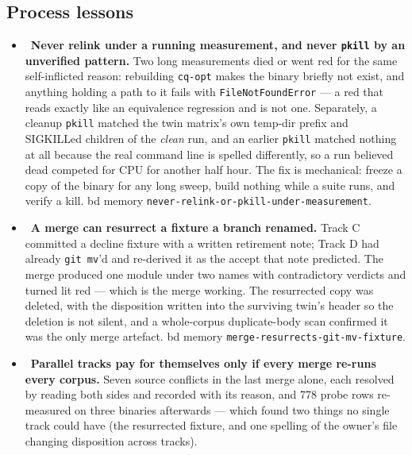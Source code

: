 \subsection*{Process lessons}
\begin{itemize}
  \item \fdoc\ \textbf{Never relink under a running measurement, and never \texttt{pkill} by an unverified
    pattern.} Two long measurements died or went red for the same self-inflicted reason: rebuilding
    \texttt{cq-opt} makes the binary briefly not exist, and anything holding a path to it fails with
    \texttt{FileNotFoundError} --- a red that reads exactly like an equivalence regression and is not one.
    Separately, a cleanup \texttt{pkill} matched the twin matrix's own temp-dir prefix and SIGKILLed
    children of the \emph{clean} run, and an earlier \texttt{pkill} matched nothing at all because the
    real command line is spelled differently, so a run believed dead competed for CPU for another half
    hour. The fix is mechanical: freeze a copy of the binary for any long sweep, build nothing while a
    suite runs, and verify a kill. bd memory \texttt{never-relink-or-pkill-under-measurement}.
  \item \fdoc\ \textbf{A merge can resurrect a fixture a branch renamed.} Track C committed a decline
    fixture with a written retirement note; Track D had already \texttt{git mv}'d and re-derived it as the
    accept that note predicted. The merge produced one module under two names with contradictory verdicts
    and turned lit red --- which is the merge working. The resurrected copy was deleted, with the
    disposition written into the surviving twin's header so the deletion is not silent, and a whole-corpus
    duplicate-body scan confirmed it was the only merge artefact. bd memory
    \texttt{merge-resurrects-git-mv-fixture}.
  \item \fdoc\ \textbf{Parallel tracks pay for themselves only if every merge re-runs every corpus.} Seven
    source conflicts in the last merge alone, each resolved by reading both sides and recorded with its
    reason, and 778 probe rows re-measured on three binaries afterwards --- which found two things no
    single track could have (the resurrected fixture, and one spelling of the owner's file changing
    disposition across tracks).
\end{itemize}

